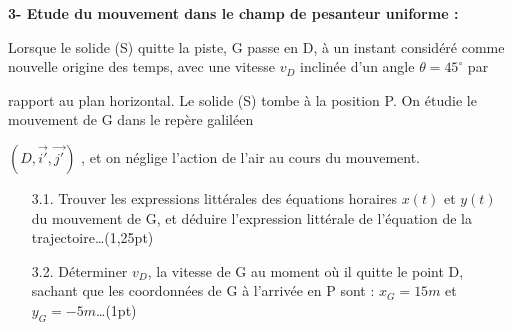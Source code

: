 \documentclass[12pt]{article}
\begin{document}
\textbf{3- Etude du mouvement dans le champ de pesanteur uniforme :}

Lorsque le solide (S) quitte la piste, G passe en D, à un instant considéré comme
nouvelle origine des temps, avec une vitesse $v_D$ inclinée d’un angle $\theta = 45^{\circ}$ par

rapport au plan horizontal. Le solide (S) tombe à la position P.
On étudie le mouvement de G dans le repère galiléen

$(D,\vec{i'}, \vec{j'})$ , et on néglige l’action
de l'air au cours du mouvement.

\begin{enumerate}
  \item[3.1.] Trouver les expressions littérales des équations horaires $x(t)$ et $y(t)$ du
mouvement de G, et déduire l’expression littérale de l’équation de la
    trajectoire\dots(1,25pt)
  \item[3.2.] Déterminer $v_D$, la vitesse de G au moment où il quitte le point D, sachant
    que les coordonnées de G à l’arrivée en P sont : $x_G = 15 m$ et $y_G = - 5 m$\dots(1pt)
  \end{enumerate}



\end{document}
